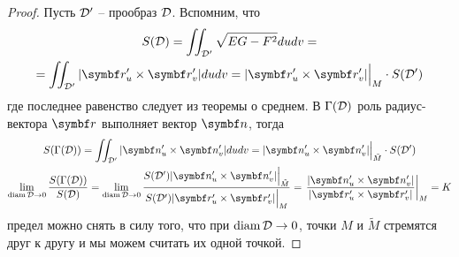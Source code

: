 \documentclass[main]{subfiles}
\begin{document}
\begin{proof}
    Пусть $\mathcal{D}'$ -- прообраз $\mathcal{D}$.
    Вспомним, что
    \begin{multline*}
        S(\fancyD) = \iint_{\fancyD'} \sqrt{EG-F^2} dudv = \\
        = \iint_{\fancyD'}|\vr'_u \times \vr'_v| dudv = |\vr'_u \times \vr'_v|\Big|_{M} \cdot S(\fancyD')
    \end{multline*}
    где последнее равенство следует из теоремы о среднем.
    В $\Gamma(\mathcal{D})$ роль радиус-вектора $\vr$ выполняет вектор $\vn$, тогда
    \begin{gather*}
        S(\Gamma(\fancyD)) = \iint_{\fancyD'} |\vn'_u \times \vn'_v|dudv =  |\vn'_u \times \vn'_v|\Big|_{\tilde{M}} \cdot S(\fancyD')\\
        \lim_{\diam \fancyD \to 0} \frac{S(\Gamma(\fancyD))}{S(\fancyD)} =
        \lim_{\diam \fancyD \to 0}  \frac{S(\fancyD')|\vn'_u \times \vn'_v| \Big|_{\tilde{M}}}{S(\fancyD')|\vr'_u \times \vr'_v|\Big|_{M} } =
        \left.\frac{|\vn'_u \times \vn'_v|}{|\vr'_u \times \vr'_v|}\right|_M = K
    \end{gather*}
    предел можно снять в силу того, что при $\operatorname{diam} \mathcal{D} \to 0$, точки $M$ и $\tilde{M}$ стремятся друг к другу и мы можем считать их одной точкой.
\end{proof}

\end{document}
